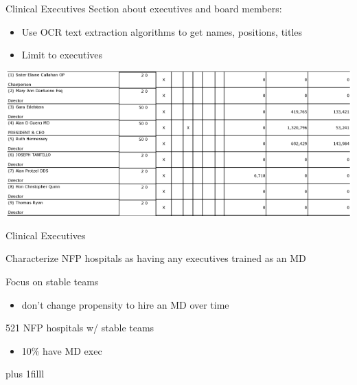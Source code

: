 \documentclass[notes,11pt, aspectratio=169]{beamer}
\newcommand{\btVFill}{\vskip0pt plus 1filll}
\newenvironment{wideitemize}{\itemize\addtolength{\itemsep}{10pt}}{\enditemize}
\begin{document}
\begin{frame}{Clinical Executives}
Section about executives and board members:
\begin{itemize}
                \item Use OCR text extraction algorithms to get names, positions, titles
                \item Limit to executives
            \end{itemize}

            \vspace{3mm}

\centering
\includegraphics[width=.75\textwidth]{Graphics/990_snip_namesexample.PNG}
    
\end{frame}

\begin{frame}{Clinical Executives}\label{clinexecs}
    \vspace{10mm}
    \begin{wideitemize}
            \item Characterize NFP hospitals as having any executives trained as an MD
            \item Focus on stable teams
            \begin{itemize}
                \item don't change propensity to hire an MD over time
            \end{itemize}
            \item 521 NFP hospitals w/ stable teams 
            \begin{itemize}
                \item 10\% have MD exec
            \end{itemize}
    \end{wideitemize}
    \btVFill
    \hyperlink{990s}{} \hyperlink{execstats}{}
\end{frame}
\end{document}
